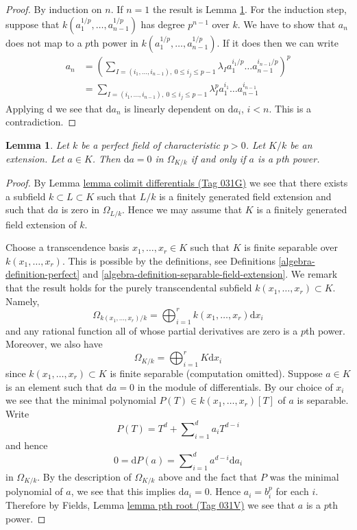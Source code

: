 \documentclass{amsart}
\theoremstyle{plain}
\newtheorem{lemma}[subsection]{Lemma}
\theoremstyle{definition}
\theoremstyle{remark}
\numberwithin{equation}{subsection}
\begin{document}
\begin{proof}
By induction on $n$. If $n = 1$ the result is
Lemma \ref{algebra-lemma-derivative-zero-pth-power}.
For the induction step, suppose that $k(a_1^{1/p}, \ldots, a_{n - 1}^{1/p})$
has degree $p^{n - 1}$ over $k$. We have to show that $a_n$ does not
map to a $p$th power in $k(a_1^{1/p}, \ldots, a_{n - 1}^{1/p})$.
If it does then we can write
\begin{align*}
a_n & =
\left(\sum\nolimits_{I = (i_1, \ldots, i_{n - 1}),\ 0 \leq i_j \leq p - 1}
\lambda_I a_1^{i_1/p} \ldots a_{n - 1}^{i_{n - 1}/p}\right)^p \\
& = \sum\nolimits_{I = (i_1, \ldots, i_{n - 1}),\ 0 \leq i_j \leq p - 1}
\lambda_I^p a_1^{i_1} \ldots a_{n - 1}^{i_{n - 1}}
\end{align*}
Applying $\text{d}$ we see that $\text{d}a_n$ is linearly dependent on
$\text{d}a_i$, $i < n$. This is a contradiction.
\end{proof}


\begin{lemma}
\label{algebra-lemma-derivative-zero-pth-power}
Let $k$ be a perfect field of characteristic $p > 0$.
Let $K/k$ be an extension.
Let $a \in K$. Then $\text{d}a = 0$ in $\Omega_{K/k}$
if and only if $a$ is a $p$th power.
\end{lemma}

\begin{proof}
By Lemma \href{https://stacks.math.columbia.edu/tag/031G}{lemma colimit differentials (Tag 031G)} we see that there exists a subfield
$k \subset L \subset K$ such that $L/k$
is a finitely generated field extension and such that
$\text{d}a$ is zero in $\Omega_{L/k}$.
Hence we may assume that $K$ is a finitely generated field extension
of $k$.

\medskip\noindent
Choose a transcendence basis $x_1, \ldots, x_r \in K$
such that $K$ is finite separable over $k(x_1, \ldots, x_r)$.
This is possible by the definitions, see
Definitions \ref{algebra-definition-perfect} and
\ref{algebra-definition-separable-field-extension}.
We remark that the result holds for the purely transcendental
subfield $k(x_1, \ldots, x_r) \subset K$.
Namely,
$$
\Omega_{k(x_1, \ldots, x_r)/k} =
\bigoplus\nolimits_{i = 1}^r k(x_1, \ldots, x_r) \text{d}x_i
$$
and any rational function all of whose partial derivatives are zero
is a $p$th power. Moreover, we also have
$$
\Omega_{K/k} =
\bigoplus\nolimits_{i = 1}^r K\text{d}x_i
$$
since $k(x_1, \ldots, x_r) \subset K$ is finite separable
(computation omitted). Suppose $a \in K$ is an element such that
$\text{d}a = 0$ in the module of differentials. By our choice of $x_i$ we
see that the minimal polynomial $P(T) \in k(x_1, \ldots, x_r)[T]$
of $a$ is separable. Write
$$
P(T) = T^d + \sum\nolimits_{i = 1}^d a_i T^{d - i}
$$
and hence
$$
0 = \text{d}P(a) = \sum\nolimits_{i = 1}^d a^{d - i}\text{d}a_i
$$
in $\Omega_{K/k}$. By the description of
$\Omega_{K/k}$ above and the fact that $P$ was the minimal
polynomial of $a$, we see that this implies $\text{d}a_i = 0$.
Hence $a_i = b_i^p$ for each $i$. Therefore by
Fields, Lemma \href{https://stacks.math.columbia.edu/tag/031V}{lemma pth root (Tag 031V)}
we see that $a$ is a $p$th power.
\end{proof}
\end{document}
